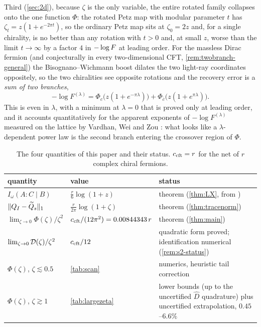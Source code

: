 Third (\cref{sec:2d}), because $\zeta$ is the only variable, the entire rotated
family collapses onto the one function $\Phi$: the rotated Petz map with modular
parameter $t$ has $\zeta_t=z(1+e^{-2\pi t})$, so the ordinary Petz map sits at
$\zeta_0=2z$ and, for a single chirality, is no better than any rotation with $t>0$ and, at small $z$, worse than the limit $t\to\infty$ by a
factor $4$ in $-\log F$ at leading order.  For the massless Dirac fermion (and conjecturally in every two-dimensional CFT, \cref{rem:twobranch-general}) the Bisognano--Wichmann
boost dilates the two light-ray coordinates oppositely, so the two chiralities
see opposite rotations and the recovery error is a \emph{sum of two branches},
\begin{equation}\label{eq:twobranch-intro}
 -\log F^{(\lambda)}=\Phi_{c}\bigl(z(1+e^{-\pi\lambda})\bigr)
 +\Phi_{\bar c}\bigl(z(1+e^{\pi\lambda})\bigr).
\end{equation}
This is even in $\lambda$, with a minimum at $\lambda=0$ that is proved only at leading order, and it accounts
quantitatively for the apparent exponents of $-\log F^{(\lambda)}$ measured on the
lattice by Vardhan, Wei and Zou \cite{VWZ}: what looks like a $\lambda$-dependent
power law is the second branch entering the crossover region of $\Phi$.

\begin{table}[ht]\centering\small
\caption{The four quantities of this paper and their status.  $c_{\rm cft}=r$ for
the net of $r$ complex chiral fermions.}\label{tab:summary}
\begin{tabular}{@{}l l l@{}}\toprule
quantity & value & status\\\midrule
$I_\omega(A{:}C\mid B)$ & $\frac r6\log(1+z)$ & theorem (\cref{thm:LX}, from \cite{LX})\\
$\lVert Q_I-\widetilde Q_s\rVert_1$ & $\frac r{2\pi}\log(1+\zeta)$ & theorem (\cref{thm:tracenorm})\\
$\lim_{\zeta\to0}\Phi(\zeta)/\zeta^2$ & $c_{\rm cft}/(12\pi^2)=0.00844343\,r$ & theorem (\cref{thm:main})\\
$\lim_{\zeta\to0}\mathcal D(\zeta)/\zeta^2$ & $c_{\rm cft}/12$ & quadratic form proved; identification numerical (\cref{rem:s2-status})\\
$\Phi(\zeta)$, $\zeta\lesssim0.5$ & \cref{tab:scan} & numerics, heuristic tail correction\\
$\Phi(\zeta)$, $\zeta\gtrsim1$ & \cref{tab:largezeta} & lower bounds (up to the uncertified $\widehat D$ quadrature) plus uncertified extrapolation, $0.45$--$6.6\%$\\
\bottomrule\end{tabular}\end{table}

